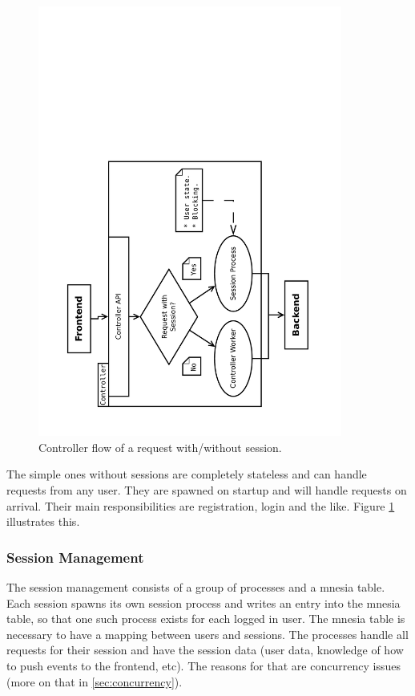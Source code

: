 \documentclass[11pt,a4paper]{report}
\begin{document}
\begin{figure}[h]
 \centering
 \includegraphics[width=10cm, angle=-90]{./graphics/Concurrency_-_session_proc.pdf}
 \vspace{-1cm}
 \caption{Controller flow of a request with/without session.}
 \label{fig:controller:session_proc}
\end{figure}

The simple ones without sessions are completely stateless and can handle requests from any user.
They are spawned on startup and will handle requests on arrival.
Their main responsibilities are registration, login and the like.
Figure \ref{fig:controller:session_proc} illustrates this.

\subsubsection{Session Management}
The session management consists of a group of processes and a mnesia table.
Each session spawns its own session process and writes an entry into the mnesia table,
so that one such process exists for each logged in user.
The mnesia table is necessary to have a mapping between users and sessions.
The processes handle all requests for their session and have the session data
(user data, knowledge of how to push events to the frontend, etc).
The reasons for that are concurrency issues (more on that in \ref{sec:concurrency}).
\end{document}
